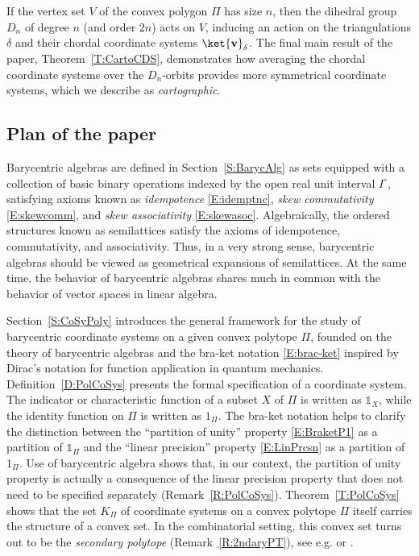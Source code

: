 \documentclass[12pt]{amsart}
\theoremstyle{plain}
\theoremstyle{definition}
\numberwithin{equation}{section}
\begin{document}
If the vertex set $V$ of the convex polygon $\Pi$ has size $n$, then the dihedral group $D_n$ of degree $n$ (and order $2n$) acts on $V$, inducing an action on the triangulations $\delta$ and their chordal coordinate systems $\ket{\mathbf v}_\delta$. The final main result of the paper, Theorem~\ref{T:CartoCDS}, demonstrates how averaging the chordal coordinate systems over the $D_n$-orbits provides more symmetrical coordinate systems, which we describe as \emph{cartographic}.





\subsection{Plan of the paper}


Barycentric algebras are defined in Section~\ref{S:BarycAlg} as sets equipped with a collection of basic binary operations indexed by the open real unit interval $I^\circ$, satisfying axioms known as \emph{idempotence} \eqref{E:idemptnc}, \emph{skew commutativity} \eqref{E:skewcomm}, and \emph{skew associativity} \eqref{E:skewasoc}. Algebraically, the ordered structures known as semilattices satisfy the axioms of idempotence, commutativity, and associativity. Thus, in a very strong sense, barycentric algebras should be viewed as geometrical expansions of semilattices. At the same time, the behavior of barycentric algebras shares much in common with the behavior of vector spaces in linear algebra.


Section~\ref{S:CoSyPoly} introduces the general framework for the study of barycentric coordinate systems on a given convex polytope $\Pi$, founded on the theory of barycentric algebras and the bra-ket notation \eqref{E:brac-ket} inspired by Dirac's notation for function application in quantum mechanics. Definition~\ref{D:PolCoSys} presents the formal specification of a coordinate system. The indicator or characteristic function of a subset $X$ of $\Pi$ is written as $\mathds 1_X$, while the identity function on $\Pi$ is written as $1_\Pi$. The bra-ket notation helps to clarify the distinction between the ``partition of unity'' property \eqref{E:BraketP1} as a partition of $\mathds 1_\Pi$ and the ``linear precision'' property \eqref{E:LinPrcsn} as a partition of $1_\Pi$.
Use of barycentric algebra shows that, in our context, the partition of unity property is actually a consequence of the linear precision property that does not need to be specified separately (Remark~\ref{R:PolCoSys}). Theorem~\ref{T:PolCoSys} shows that the set $K_\Pi$ of coordinate systems on a convex polytope $\Pi$ itself carries the structure of a convex set.
In the combinatorial setting, this convex set turns out to be the \emph{secondary polytope} (Remark~\ref{R:2ndaryPT}), see e.g. \cite[p.7, \S5.1]{DLRS} or \cite[Ch.~7]{GelKapZel}.
\end{document}
